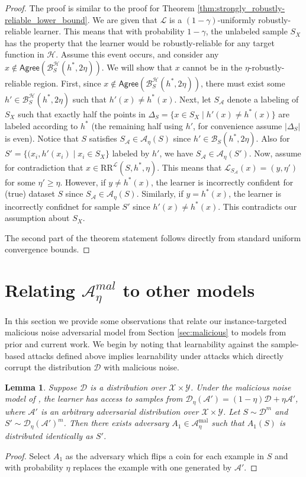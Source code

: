 \documentclass[11pt]{article}
\newcommand{\CR}{\text{RR}}
\newtheorem{lemma}[theorem]{Lemma}
\newcommand{\0}{\mathbf{0}}
\newcommand{\1}{\mathbf{1}}
\newcommand{\cA}{\mathcal{A}}
\newcommand{\cB}{\mathcal{B}}
\newcommand{\cD}{\mathcal{D}}
\newcommand{\cH}{\mathcal{H}}
\newcommand{\cL}{\mathcal{L}}
\newcommand{\cY}{\mathcal{Y}}
\newcommand{\cX}{\mathcal{X}}
\newcommand{\Agree}{\mathsf{Agree}}
\begin{document}
\begin{proof}
The proof is similar to the proof for Theorem \ref{thm:strongly_robustly-reliable_lower_bound}.
We are given that $\cL$ is a $(1-\gamma)$-uniformly robustly-reliable learner.  This means that with probability $1-\gamma$, the unlabeled sample $S_X$ has the property that the learner would be robustly-reliable for any target function in $\cH$.  Assume this event occurs, and consider any $x \not\in \Agree(\cB_{S}^\cH(h^*,2\eta))$.  We will show that $x$ cannot be in the $\eta$-robustly-reliable region.  First, since $x \not\in \Agree(\cB_{S}^\cH(h^*,2\eta))$, there must exist some $h' \in \cB_{S}^\cH(h^*,2\eta)$ such that $h'(x) \neq h^*(x)$. Next, let $S_\cA$ denote a labeling of $S_X$ such that exactly half the points in $\Delta_S=\{x\in S_X\mid h'(x)\ne h^*(x)\}$ are labeled according to $h^*$ (the remaining half using $h'$, for convenience assume $|\Delta_S|$ is even). Notice that $S$ satisfies $S_\cA\in\cA_\eta(S)$ since $h'\in \cB_{S}(h^*,2\eta)$. Also for $S'=\{(x_i,h'(x_i)\mid x_i\in S_X\}$ labeled by $h'$, we have $S_\cA\in\cA_\eta(S')$. Now, assume for contradiction that $x \in \CR^\cL(S,h^*,\eta)$. This means that $\cL_{S_\cA}(x)=(y,\eta')$ for some $\eta'\geq \eta$.  However, if $y\ne h^*(x)$, the learner is incorrectly confident for (true) dataset $S$ since $S_\cA\in\cA_\eta(S)$.
Similarly, if $y=h^*(x)$, the learner is incorrectly confidnet for sample $S'$ since $h'(x)\ne h^*(x)$. This contradicts our assumption about $S_X$.

The second part of the theorem statement follows directly from standard uniform convergence bounds.
\end{proof}

\section{Relating $\cA_\eta^{mal}$ to other models}
\label{sec:relation}


In this section we provide some observations that relate our instance-targeted malicious noise adversarial model from Section \ref{sec:malicious} to models from prior and current work. We begin by noting that learnability against the sample-based attacks defined above implies learnability under attacks which directly corrupt the distribution $\cD$ with malicious noise.

\begin{lemma}
Suppose $\cD$ is a distribution over $\cX\times\cY$. Under the malicious noise model of \cite{kearns1993learning}, the learner has access to samples from $\cD_\eta(\cA')=(1-\eta)\cD+\eta\cA'$, where $\cA'$ is an arbitrary adversarial distribution over $\cX\times\cY$. Let $S\sim\cD^m$ and $S'\sim\cD_\eta(\cA')^m$. Then there exists adversary $A_1\in\cA^{\text{mal}}_\eta$ such that $A_1(S)$ is distributed identically as $S'$.
\end{lemma}\label{lem:contains-mal}
\begin{proof}
Select $A_1$ as the adversary which flips a coin for each example in $S$ and with probability $\eta$ replaces the example with one generated by $\cA'$.
\end{proof}
\end{document}
